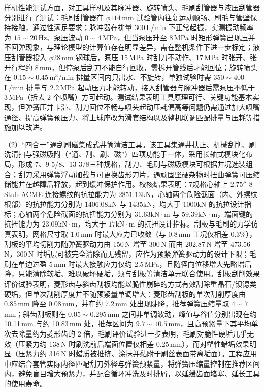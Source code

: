 样机性能测试方面，对工具样机及其脉冲器、旋转喷头、毛刷刮管器与液压刮管器分别进行了测试：毛刷刮管器在 $\phi 114$\,mm 试验管内往复运动顺畅、刷毛与管壁保持接触，通过性满足要求；脉冲器在排量 300\,L/min 下正常起振，实测振动频率为 $15\sim20$\,Hz、泵压波动 $0\sim4$\,MPa，但当泵压升至 8\,MPa 时矩形弹簧出现压并不回弹现象，与理论模型的计算值存在明显差异，需在整机条件下进一步标定；液压刮管器投入 $\phi 28$\,mm 钢球后，泵压 15\,MPa 时刮刀不动作、17\,MPa 时张开、张开行程约 8\,mm，但停泵后刮刀不能自行回收，需拆开管线后才能回位；旋转喷头在 $0.15\sim0.45$\,m$^3$/min 排量区间内只出水、不旋转，单独试验时需 $350\sim400$\,L/min 排量与 2.2\,MPa 起动压力才能转动，接入刮管器与脉冲器后需泵压不低于 3\,MPa（拆去 2 个喷嘴）方可起动。测试结果表明工具原理可行、关键功能基本实现，但弹簧压并卡滞、刮刀回位不畅与喷头起动压耗偏高等问题仍需通过加大喷嘴通径、提高弹簧预压力、将上球座改为滑套结构以及整机联调匹配排量与压耗等措施加以改进。


（2）“四合一”通刮刷磁集成式井筒清洁工具。该工具集通井扶正、机械刮削、刷洗清扫与强磁吸附（“通、刮、刷、磁”）四项功能于一体，采用长轴式模块化布局，形成 7\inch、9-5/8\inch、13-3/8\inch 三种规格，刮刀、毛刷与磁吸模块可根据井况选装组合；刮刀采用弹簧浮动加载与可更换齿形刀片，遇顽固坚硬杂物时扭曲弹簧可压缩储能并在越障后释放，起到缓冲保护作用。校核结果表明：7\inch 规格心轴上 $2.75''\text{-}8$ Stub ACME 连接螺纹的抗拉能力为 $2851.13\mathrm{kN}$，心轴两个危险截面（内、外螺纹根部）的抗拉能力分别为 $1406.08\mathrm{kN}$ 与 $1435\mathrm{kN}$，均大于 $1000\mathrm{kN}$ 的抗拉设计指标；心轴两个危险截面的抗扭能力分别为 $31.63\mathrm{kN\cdot m}$ 与 $59.39\mathrm{kN\cdot m}$，端面键的抗扭能力为 $23.09\mathrm{kN\cdot m}$，均大于 $17\mathrm{kN\cdot m}$ 的抗扭设计指标。刮板与毛刷的力学仿真表明，网格尺寸取 1.0\,mm 时最大应力已收敛（与 0.8\,mm 工况仅相差 0.3\%），刮板的平均切削力随弹簧驱动力由 150\,N 增至 300\,N 而由 202.87\,N 增至 473.56\,N，300\,N 时垢层可被完全清除而无残留，应作为预紧弹簧驱动力的设计下限；毛刷在单边过盈 5\,mm 时最大接触应力仅约 2.5\,MPa，且随径向位移增大先略增后降，只能清除软垢、难以破坏硬垢，须与刮板等清洁单元联合使用。刮板刮削效果评价试验表明，菱形齿与斜齿刮板均能以脆性崩碎的方式有效刮除重晶石/钡锶类硬垢，但单次刮削厚度并不随预紧量单调增大：菱形齿刮板的单次刮削厚度由 0.85\,mm 降至 0.08\,mm，并在约 7.2\,mm 处出现陡降，推荐弹簧压缩量取 $4\sim7$\,mm；斜齿刮板则在 $0.05\sim0.295$\,mm 之间非单调波动，峰值与谷值分别出现在约 10.11\,mm 与约 10.83\,mm 处，推荐区间为 $9.7\sim10.5$\,mm，且高预紧量下其平均单次去除量约为菱形齿的 2 倍。毛刷评价试验进一步表明，毛刷对脆性硬垢几乎无效（压紧力约 138\,N 时刷洗前后端面位置仅相差 0.25\,mm），而对塑性蜡垢效果明显（压紧力约 316\,N 时蜡质被推挤、涂抹并黏附于刷丝表面带离垢面）。工程应用中应结合套管实际内径匹配刮刀外径与弹簧预紧量，将弹簧压缩量控制在推荐区间内，避免盲目增大预紧力，并配合循环冲洗及时排屑，以延缓齿面堵塞、延长工具的使用寿命。

